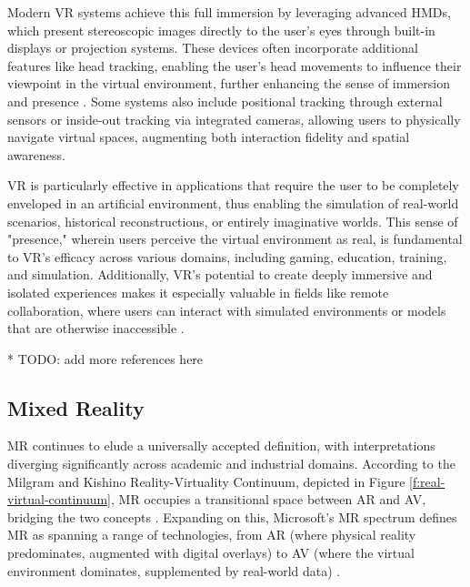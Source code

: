     Modern \ac{VR} systems achieve this full immersion by leveraging advanced \ac{HMDs}, which present stereoscopic images directly to the user’s eyes through built-in displays or projection systems. These devices often incorporate additional features like head tracking, enabling the user’s head movements to influence their viewpoint in the virtual environment, further enhancing the sense of immersion and presence \cite{whatismixedreality}. Some systems also include positional tracking through external sensors or inside-out tracking via integrated cameras, allowing users to physically navigate virtual spaces, augmenting both interaction fidelity and spatial awareness.

    \ac{VR} is particularly effective in applications that require the user to be completely enveloped in an artificial environment, thus enabling the simulation of real-world scenarios, historical reconstructions, or entirely imaginative worlds. This sense of "presence," wherein users perceive the virtual environment as real, is fundamental to \ac{VR}'s efficacy across various domains, including gaming, education, training, and simulation. Additionally, \ac{VR}'s potential to create deeply immersive and isolated experiences makes it especially valuable in fields like remote collaboration, where users can interact with simulated environments or models that are otherwise inaccessible \cite{8712803}.

    * TODO: add more references here  


\subsection{Mixed Reality}
\label{subsection:digital-realities}
   
    \ac{MR} continues to elude a universally accepted definition, with interpretations diverging significantly across academic and industrial domains. According to the Milgram and Kishino Reality-Virtuality Continuum, depicted in Figure \ref{f:real-virtual-continuum}, \ac{MR} occupies a transitional space between \ac{AR} and \ac{AV}, bridging the two concepts \cite{milgram1994}. Expanding on this, Microsoft’s \ac{MR} spectrum defines \ac{MR} as spanning a range of technologies, from \ac{AR} (where physical reality predominates, augmented with digital overlays) to \ac{AV} (where the virtual environment dominates, supplemented by real-world data) \cite{microsoft_mixed_reality}. 

